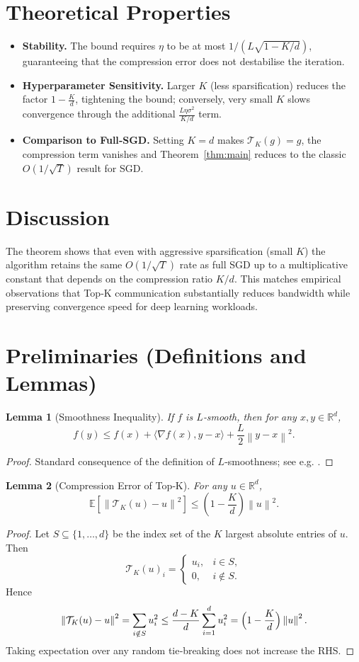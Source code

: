 \documentclass{article}
\newtheorem{lemma}{Lemma}
\newcommand{\E}{\mathbb{E}}
\newcommand{\R}{\mathbb{R}}
\newcommand{\norm}[1]{\left\|#1\right\|}
\newcommand{\topk}[1]{\mathcal{T}_K\!\left(#1\right)}
\begin{document}
\section*{Theoretical Properties}
\begin{itemize}[leftmargin=*]
\item \textbf{Stability.} The bound requires $\eta$ to be at most $1/(L\sqrt{1-K/d})$, guaranteeing that the compression error does not destabilise the iteration.
\item \textbf{Hyperparameter Sensitivity.} Larger $K$ (less sparsification) reduces the factor $1-\frac{K}{d}$, tightening the bound; conversely, very small $K$ slows convergence through the additional $\frac{L\eta\sigma^{2}}{K/d}$ term.
\item \textbf{Comparison to Full‑SGD.} Setting $K=d$ makes $\topk{g}=g$, the compression term vanishes and Theorem~\ref{thm:main} reduces to the classic $O(1/\sqrt{T})$ result for SGD.
\end{itemize}

\section*{Discussion}
The theorem shows that even with aggressive sparsification (small $K$) the algorithm retains the same $O(1/\sqrt{T})$ rate as full SGD up to a multiplicative constant that depends on the compression ratio $K/d$. This matches empirical observations that Top‑K communication substantially reduces bandwidth while preserving convergence speed for deep learning workloads.

\newpage
\section*{Preliminaries (Definitions and Lemmas)}
\begin{lemma}[Smoothness Inequality]
\label{lem:smooth}
If $f$ is $L$‑smooth, then for any $x,y\in\R^{d}$,
\[
f(y)\le f(x)+\langle \nabla f(x),y-x\rangle+\frac{L}{2}\norm{y-x}^{2}.
\]
\end{lemma}
\begin{proof}
Standard consequence of the definition of $L$‑smoothness; see e.g. \cite{nesterov2004introductory}. \hfill\qedsymbol
\end{proof}

\begin{lemma}[Compression Error of Top‑K]
\label{lem:topk}
For any $u\in\R^{d}$,
\[
\E\!\left[\norm{\topk{u}-u}^{2}\right]\le\left(1-\frac{K}{d}\right)\norm{u}^{2}.
\]
\end{lemma}
\begin{proof}
Let $S\subseteq\{1,\dots,d\}$ be the index set of the $K$ largest absolute entries of $u$. Then
\[
\topk{u}_i=
\begin{cases}
u_i,& i\in S,\\
0,& i\notin S.
\end{cases}
\]
Hence
\[
\norm{\topk{u}-u}^{2}
= \sum_{i\notin S}u_i^{2}
\le \frac{d-K}{d}\sum_{i=1}^{d}u_i^{2}
= \Bigl(1-\frac{K}{d}\Bigr)\norm{u}^{2}.
\]
Taking expectation over any random tie‑breaking does not increase the RHS. \hfill\qedsymbol
\end{proof}
\end{document}
